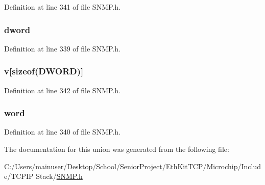 Definition at line 341 of file S\+N\+M\+P.\+h.

\hypertarget{union_s_n_m_p___v_a_l_acc4df36cf50672e0d8bfd4f0fd33bc75}{}
\subsubsection[{dword}]{ dword}\label{union_s_n_m_p___v_a_l_acc4df36cf50672e0d8bfd4f0fd33bc75}


Definition at line 339 of file S\+N\+M\+P.\+h.

\hypertarget{union_s_n_m_p___v_a_l_aceb98f68a6ef3b83de69a0b6f0736e9f}{}
\subsubsection[{v}]{ v\mbox{[}sizeof({\bf D\+W\+O\+R\+D})\mbox{]}}\label{union_s_n_m_p___v_a_l_aceb98f68a6ef3b83de69a0b6f0736e9f}


Definition at line 342 of file S\+N\+M\+P.\+h.

\hypertarget{union_s_n_m_p___v_a_l_ac5d0442b48217080ee07971744b74011}{}
\subsubsection[{word}]{ word}\label{union_s_n_m_p___v_a_l_ac5d0442b48217080ee07971744b74011}


Definition at line 340 of file S\+N\+M\+P.\+h.



The documentation for this union was generated from the following file\+:\begin{DoxyCompactItemize}
\item 
C\+:/\+Users/mainuser/\+Desktop/\+School/\+Senior\+Project/\+Eth\+Kit\+T\+C\+P/\+Microchip/\+Include/\+T\+C\+P\+I\+P Stack/\hyperlink{_s_n_m_p_8h}{S\+N\+M\+P.\+h}\end{DoxyCompactItemize}
